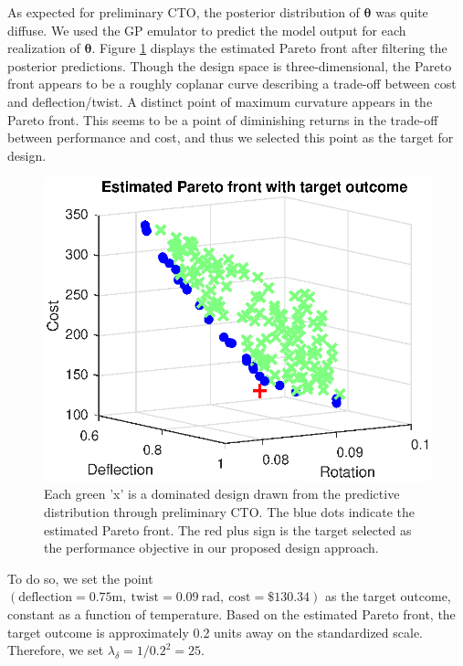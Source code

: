 \documentclass[12pt]{article}
\begin{document}
%
As expected for preliminary CTO, the posterior distribution of $\boldsymbol\theta$ was quite diffuse.
%
We used the GP emulator to predict the model output for each realization of $\boldsymbol \theta$.
%
Figure \ref{fig:elbow} displays the estimated Pareto front after filtering the posterior predictions.
%
Though the design space is three-dimensional, the Pareto front appears to be a roughly coplanar curve describing a trade-off between cost and deflection/twist.
%
A distinct point of maximum curvature appears in the Pareto front.
%
This seems to be a point of diminishing returns in the trade-off between performance and cost, and thus we selected this point as the target for design.
%
\begin{figure}[tb]
\centering
\includegraphics[scale=0.8]{FIG_est_PF_with_des_obs.eps}
\caption{Each green 'x' is a dominated design drawn from the predictive distribution through preliminary CTO. The blue dots indicate the estimated Pareto front. The red plus sign is the target selected as the performance objective in our proposed design approach.}
\label{fig:elbow}
\end{figure}
%
To do so, we set the point $(\mathrm{deflection}=0.75\mathrm m,\
\mathrm{twist}=0.09\ \mathrm{rad},\
\mathrm{cost}=\$130.34)$
 as the target outcome, constant as a function of temperature.
%
Based on the estimated Pareto front, the target outcome is approximately 0.2 units away on the standardized scale.
%
Therefore, we set $\lambda_\delta=1/0.2^2=25.$
%
\end{document}
